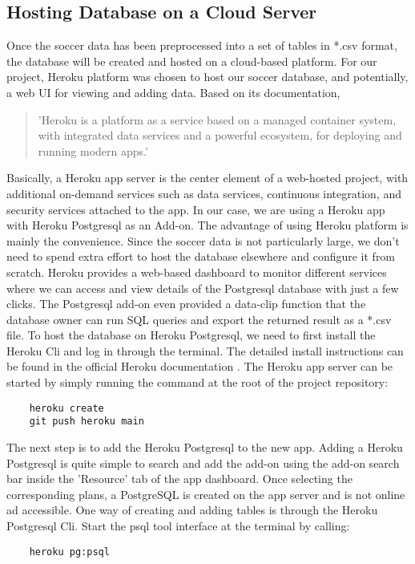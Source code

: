 \subsection{Hosting Database on a Cloud Server}
Once the soccer data has been preprocessed into a set of tables in *.csv format, the database will be created and hosted on a cloud-based platform. For our project, Heroku platform was chosen to host our soccer database, and potentially, a web UI for viewing and adding data.
Based on its documentation, \begin{quote}
    'Heroku is a platform as a service based on a managed container system, with integrated data services and a powerful ecosystem, for deploying and running modern apps.' \cite{b10}
\end{quote} Basically, a Heroku app server is the center element of a web-hosted project, with additional on-demand services such as data services, continuous integration, and security services attached to the app. In our case, we are using a Heroku app with Heroku Postgresql as an Add-on. The advantage of using Heroku platform is mainly the convenience. Since the soccer data is not particularly large, we don't need to spend extra effort to host the database elsewhere and configure it from scratch. Heroku provides a web-based dashboard to monitor different services where we can access and view details of the Postgresql database with just a few clicks. The Postgresql add-on even provided a data-clip function that the database owner can run SQL queries and export the returned result as a *.csv file.
To host the database on Heroku Postgresql, we need to first install the Heroku Cli and log in through the terminal. The detailed install instructions can be found in the official Heroku documentation \cite{b11}. The Heroku app server can be started by simply running the command at the root of the project repository: 
\begin{verbatim}
    heroku create
    git push heroku main
\end{verbatim}
The next step is to add the Heroku Postgresql to the new app. Adding a Heroku Postgresql is quite simple to search and add the add-on using the add-on search bar inside the 'Resource' tab of the app dashboard. Once selecting the corresponding plans, a PostgreSQL is created on the app server and is not online ad accessible. One way of creating and adding tables is through the Heroku Postgresql Cli. Start the psql tool interface at the terminal by calling: \begin{verbatim}
    heroku pg:psql
\end{verbatim} 

